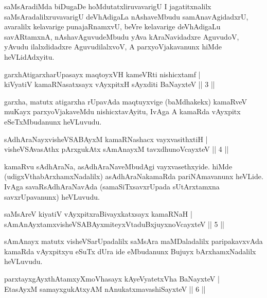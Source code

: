 \begin{artha}
saMsAradiMda biDugaDe hoMdutatxliruvavarigU I jagatitxnalilx saMsAradalilxruvavarigU deVhAdigaLa nAshaveMbudu samAnavAgidadxrU, avaralilx kelavarige punajaRnamxvU, beVre kelavarige deVhAdigaLu savARtamxnA, nAshavAguvudeMbudu yAva kAraNavidadxre AguvudoV, yAvudu ilalxdidadxre AguvudilalxvoV, A parxyoVjakavanunx hiMde heVLidAdxyitu.
\end{artha}


\begin{shl}
garxhAtigarxharUpasayx maqtoyxVH kameVRti nishicxtamf |\\
kiVyatiV kamaRNasatxsayx vAyxpitxH sAyxditi BaNayxteV \hfill || 3 ||
\end{shl}

\begin{artha}
garxha, matutx atigarxha rUpavAda maqtuyxvige (baMdhakekx) kamaRveV muKayx parxyoVjakaveMdu nishicxtavAyitu, IvAga A kamaRda vAyxpitx eSeTxMbudanunx heVLuvudu.
\end{artha}

\begin{shl}
sAdhAraNayxvisheVSABAyxM kamaRNashacx vayxvasithxtiH |\\
visheVSAvasAthx pArxgukAtx sAmAnayxM tavxdhunoVcayxteV \hfill || 4 ||
\end{shl}

\begin{artha}
kamaRvu sAdhAraNa, asAdhAraNaveMbudAgi vayxvasethxyide. hiMde (udigxVthabArxhamxNadalilx) asAdhAraNakamaRda pariNAmavanunx heVLide. IvAga savaRsAdhAraNavAda (samaSiTxsavxrUpada sUtArxtamxna savxrUpavanunx) heVLuvudu.
\end{artha}


\begin{shl}
saMsAreV kiyatiV vAyxpitxraBivayxkatxsayx kamaRNaH |\\
sAmAnAyxtamxvisheVSABAyxmiteyxVtaduBxjuyxnoVcayxteV \hfill || 5 ||
\end{shl}

\begin{artha}
sAmAnayx matutx visheVSarUpadalilx saMsAra maMDaladalilx paripakavxvAda kamaRda vAyxpitxyu eSuTx dUra ide eMbudanunx Bujuyx bArxhamxNadalilx heVLuvudu.
\end{artha}

\begin{shl}
parxtayxgAyxthAtamxyXmoVhasayx kAyeVyatetxVha BaNayxteV |\\
EtasAyxM samayxgukAtxyAM nAnukatxmavashiSayxteV \hfill || 6 ||
\end{shl}

